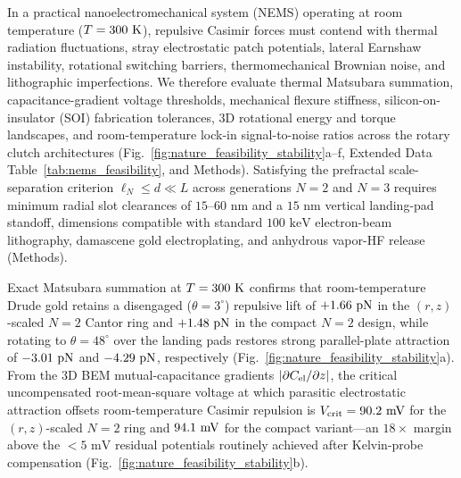 \documentclass[pdflatex,sn-nature]{sn-jnl}
\DeclareRobustCommand{\roundone}[1]{\fpeval{round(#1,1)}}
\DeclareRobustCommand{\roundtwo}[1]{\fpeval{round(#1,2)}}
\begin{document}
In a practical nanoelectromechanical system (NEMS) operating at room temperature ($T = 300{}\text{ K}$), repulsive Casimir forces must contend with thermal radiation fluctuations, stray electrostatic patch potentials, lateral Earnshaw instability, rotational switching barriers, thermomechanical Brownian noise, and lithographic imperfections. We therefore evaluate thermal Matsubara summation, capacitance-gradient voltage thresholds, mechanical flexure stiffness, silicon-on-insulator (SOI) fabrication tolerances, 3D rotational energy and torque landscapes, and room-temperature lock-in signal-to-noise ratios across the rotary clutch architectures (Fig.~\ref{fig:nature_feasibility_stability}a--f, Extended Data Table~\ref{tab:nems_feasibility}, and Methods). Satisfying the prefractal scale-separation criterion\cite{gordon2026prd} $\ell_N \le d \ll L$ across generations $N=2$ and $N=3$ requires minimum radial slot clearances of $15\text{--}60\text{ nm}$ and a $15\text{ nm}$ vertical landing-pad standoff, dimensions compatible with standard $100\text{ keV}$ electron-beam lithography, damascene gold electroplating, and anhydrous vapor-HF release (Methods).

Exact Matsubara summation at $T = 300{}\text{ K}$ confirms that room-temperature Drude gold retains a disengaged ($\theta=3^\circ$) repulsive lift of $+\roundtwo{\NatureCantorNtwoHybridrzPatchPotentialFCasimirGoldThreezerozerokPn}\text{ pN}$ in the $(r,z)$-scaled $N=2$ Cantor ring and $+\roundtwo{\NatureRotCeightCompactNtwoPatchPotentialFCasimirGoldThreezerozerokPn}\text{ pN}$ in the compact $N=2$ design, while rotating to $\theta=48^\circ$ over the landing pads restores strong parallel-plate attraction of $\roundtwo{\NatureCantorNtwoHybridrzStepfiveForceZPn}\text{ pN}$ and $\roundtwo{\NatureRotCeightCompactNtwoSteptwooneForceZPn}\text{ pN}$, respectively (Fig.~\ref{fig:nature_feasibility_stability}a). From the 3D BEM mutual-capacitance gradients $|\partial C_{\rm el}/\partial z|$, the critical uncompensated root-mean-square voltage at which parasitic electrostatic attraction offsets room-temperature Casimir repulsion is $V_{\rm crit} = \roundone{\NatureCantorNtwoHybridrzPatchPotentialVCritMv}\text{ mV}$ for the $(r,z)$-scaled $N=2$ ring and $\roundone{\NatureRotCeightCompactNtwoPatchPotentialVCritMv}\text{ mV}$ for the compact variant---an $18\times$ margin above the $<5\text{ mV}$ residual potentials routinely achieved after Kelvin-probe compensation (Fig.~\ref{fig:nature_feasibility_stability}b).
\end{document}
